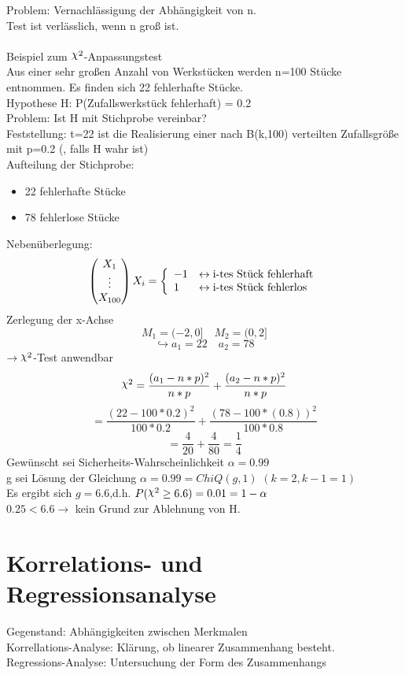 \documentclass[a4paper,12pt]{scrartcl}
\DeclareRobustCommand{\rchi}{{\mathpalette\irchi\relax}}
\newcommand{\irchi}[2]{\raisebox{\depth}{$#1\chi$}}
\begin{document}
  Problem: Vernachlässigung der Abhängigkeit von n.\\
  Test ist verlässlich, wenn n groß ist.\\
  \\
  Beispiel zum $\rchi^2$-Anpassungstest\\
  Aus einer sehr großen Anzahl von Werkstücken werden n=100 Stücke entnommen.
  Es finden sich 22 fehlerhafte Stücke.\\
  Hypothese H: P(Zufallswerkstück fehlerhaft) = 0.2\\
  Problem: Ist H mit Stichprobe vereinbar?\\
  Feststellung: t=22 ist die Realisierung einer nach B(k,100) verteilten Zufallsgröße mit p=0.2 (, falls H wahr ist)\\
  Aufteilung der Stichprobe:
  \begin{itemize}
   \item 22 fehlerhafte Stücke
   \item 78 fehlerlose Stücke
  \end{itemize}
  
  Nebenüberlegung:
  $$\begin{pmatrix}
     X_1\\\vdots\\X_{100}
    \end{pmatrix} X_i = \left \{ \begin{array}{ l l }
                                 -1 & \leftrightarrow \text{i-tes Stück fehlerhaft}\\
                                 1 & \leftrightarrow \text{i-tes Stück fehlerlos}
                                \end{array} \right. $$
 Zerlegung der x-Achse
 $$M_1=(-2,0]\quad M_2=(0,2] $$
 $$\hookrightarrow a_1=22\quad a_2=78 $$
  $\to \rchi^2$-Test anwendbar\\
  $$\rchi^2 = \frac{(a_1-n*p)^2}{n*p}+\frac{(a_2-n*p)^2}{n*p} $$
  $$=\frac{(22-100*0.2)^2}{100*0.2}+\frac{(78-100*(0.8))^2}{100*0.8}$$
  $$=\frac{4}{20}+\frac{4}{80}=\frac{1}{4}$$
  Gewünscht sei Sicherheits-Wahrscheinlichkeit $\alpha=0.99$\\
  g sei Lösung der Gleichung $\alpha = 0.99 = ChiQ(g,1)$ $(k=2, k-1=1)$\\
  Es ergibt sich $g=6.6$,d.h. $P(\rchi^2\geq 6.6) = 0.01 = 1-\alpha$\\
  $0.25<6.6 \to$ kein Grund zur Ablehnung von H.
  
  \section{Korrelations- und Regressionsanalyse}
  Gegenstand: Abhängigkeiten zwischen Merkmalen\\
  Korrellations-Analyse: Klärung, ob linearer Zusammenhang besteht.\\
  Regressions-Analyse: Untersuchung der Form des Zusammenhangs
  
\end{document}
